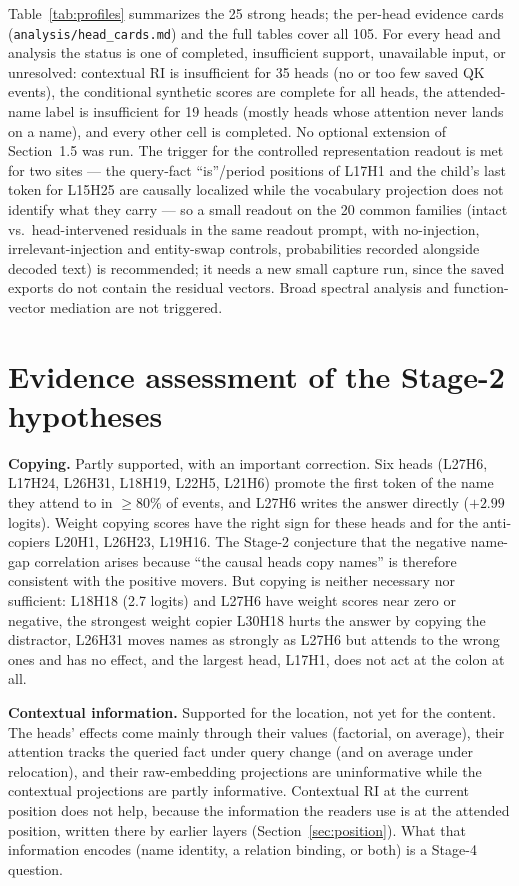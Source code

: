 \documentclass[11pt,a4paper]{article}
\begin{document}
Table~\ref{tab:profiles} summarizes the 25 strong heads; the per-head evidence cards
(\texttt{analysis/head\_cards.md}) and the full tables cover all 105. For every head
and analysis the status is one of completed, insufficient support, unavailable input,
or unresolved: contextual RI is insufficient for 35 heads (no or too few saved QK
events), the conditional synthetic scores are complete for all heads, the
attended-name label is insufficient for 19 heads (mostly heads whose attention never
lands on a name), and every other cell is completed.
No optional extension of Section~1.5 was run. The trigger for the controlled
representation readout is met for two sites --- the query-fact ``is''/period positions
of L17H1 and the child's last token for L15H25 are causally localized while the
vocabulary projection does not identify what they carry --- so a small readout on the 20
common families (intact vs.\ head-intervened residuals in the same readout prompt, with
no-injection, irrelevant-injection and entity-swap controls, probabilities recorded
alongside decoded text) is recommended; it needs a new small capture run, since the
saved exports do not contain the residual vectors. Broad spectral analysis and
function-vector mediation are not triggered.

\section{Evidence assessment of the Stage-2 hypotheses}
\label{sec:hyp}
\textbf{Copying.} Partly supported, with an important correction. Six heads
(L27H6, L17H24, L26H31, L18H19, L22H5, L21H6) promote the first token of the name they
attend to in $\ge80\%$ of events, and L27H6 writes the answer directly ($+2.99$
logits).
Weight copying scores have the right sign for these heads and for the anti-copiers
L20H1, L26H23, L19H16. The Stage-2 conjecture that the negative name-gap correlation
arises because ``the causal heads copy names'' is therefore consistent with the
positive movers. But copying is neither necessary nor sufficient: L18H18 (2.7 logits)
and L27H6 have weight scores near zero or negative, the strongest weight copier L30H18
hurts the answer by copying the distractor, L26H31 moves names as strongly as L27H6 but
attends to the wrong ones and has no effect, and the largest head, L17H1, does not act
at the colon at all.

\textbf{Contextual information.} Supported for the location, not yet for the content.
The heads' effects come mainly through their values (factorial, on average), their
attention tracks the queried fact under query change (and on average under relocation),
and their raw-embedding projections
are uninformative while the contextual projections are partly informative. Contextual
RI at the current position does not help, because the information the readers use is
at the attended position, written there by earlier layers (Section~\ref{sec:position}).
What that information encodes (name identity, a relation binding, or both) is a
Stage-4 question.
\end{document}
